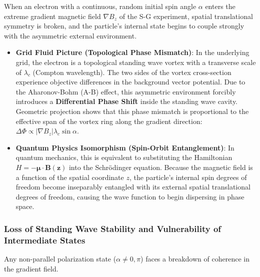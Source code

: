 \documentclass[12pt, a4paper]{article}
\begin{document}
When an electron with a continuous, random initial spin angle $\alpha$ enters the extreme gradient magnetic field $\nabla B_z$ of the S-G experiment, spatial translational symmetry is broken, and the particle's internal state begins to couple strongly with the asymmetric external environment.

\begin{itemize}
    \item \textbf{Grid Fluid Picture (Topological Phase Mismatch)}: In the underlying grid, the electron is a topological standing wave vortex with a transverse scale of $\lambda_c$ (Compton wavelength). The two sides of the vortex cross-section experience objective differences in the background vector potential. Due to the Aharonov-Bohm (A-B) effect, this asymmetric environment forcibly introduces a \textbf{Differential Phase Shift} inside the standing wave cavity. Geometric projection shows that this phase mismatch is proportional to the effective span of the vortex ring along the gradient direction: $\Delta \Phi \propto |\nabla B_z| \lambda_c \sin\alpha$.
    \item \textbf{Quantum Physics Isomorphism (Spin-Orbit Entanglement)}: In quantum mechanics, this is equivalent to substituting the Hamiltonian $H = -\boldsymbol{\mu} \cdot \mathbf{B}(\mathbf{z})$ into the Schr\"{o}dinger equation. Because the magnetic field is a function of the spatial coordinate $z$, the particle's internal spin degrees of freedom become inseparably entangled with its external spatial translational degrees of freedom, causing the wave function to begin dispersing in phase space.
\end{itemize}

\subsubsection{Loss of Standing Wave Stability and Vulnerability of Intermediate States}

Any non-parallel polarization state ($\alpha \neq 0, \pi$) faces a breakdown of coherence in the gradient field.
\end{document}

